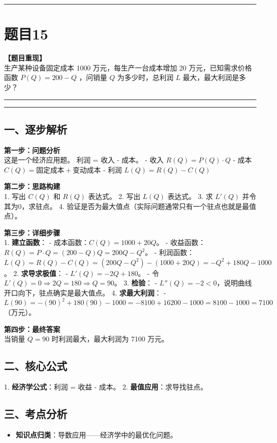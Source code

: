 \documentclass[12pt, a4paper]{ctexart}
\newcommand{\TopSeparator}{
    \par\noindent\rule{\textwidth}{1.5pt}\vspace{0.5em} %
}
\newcommand{\AnalysisSeparator}{
    \par\noindent\rule{\textwidth}{0.5pt}\vspace{0.2em}\hrule\vspace{0.5em} %
}
\newenvironment{RedAnalysis}{
    \par
    \color{red} %
}{
    \par
    \color{black} %
}
\begin{document}
\vspace{2em}

\TopSeparator
\section*{题目15}

\textbf{【题目重现】} \\
生产某种设备固定成本 1000 万元，每生产一台成本增加 20 万元，已知需求价格函数 $ P(Q) = 200 - Q $ ，问销量 $Q$ 为多少时，总利润 $L$ 最大，最大利润是多少？

\AnalysisSeparator

\begin{RedAnalysis}

\subsection*{一、逐步解析}

\textbf{第一步：问题分析} \\
这是一个经济应用题。
利润 = 收入 - 成本。
- 收入 $R(Q) = P(Q) \cdot Q$
- 成本 $C(Q) = \text{固定成本} + \text{变动成本}$
- 利润 $L(Q) = R(Q) - C(Q)$

\textbf{第二步：思路构建} \\
1. 写出 $C(Q)$ 和 $R(Q)$ 表达式。
2. 写出 $L(Q)$ 表达式。
3. 求 $L'(Q)$ 并令其为0，求驻点。
4. 验证是否为最大值点（实际问题通常只有一个驻点也就是最值点）。

\textbf{第三步：详细步骤} \\
1. \textbf{建立函数}：
   - 成本函数：$C(Q) = 1000 + 20Q$。
   - 收益函数：$R(Q) = P \cdot Q = (200 - Q)Q = 200Q - Q^2$。
   - 利润函数：$L(Q) = R(Q) - C(Q) = (200Q - Q^2) - (1000 + 20Q) = -Q^2 + 180Q - 1000$。
2. \textbf{求导求极值}：
   - $L'(Q) = -2Q + 180$。
   - 令 $L'(Q) = 0 \Rightarrow 2Q = 180 \Rightarrow Q = 90$。
3. \textbf{检验}：
   - $L''(Q) = -2 < 0$，说明曲线开口向下，驻点确实是最大值点。
4. \textbf{求最大利润}：
   - $L(90) = -(90)^2 + 180(90) - 1000 = -8100 + 16200 - 1000 = 8100 - 1000 = 7100$（万元）。

\textbf{第四步：最终答案} \\
当销量 $Q=90$ 时利润最大，最大利润为 7100 万元。

\subsection*{二、核心公式}
1. \textbf{经济学公式}：利润 = 收益 - 成本。
2. \textbf{最值应用}：求导找驻点。

\subsection*{三、考点分析}
\begin{itemize}
    \item \textbf{知识点归类}：导数应用——经济学中的最优化问题。
\end{itemize}

\end{RedAnalysis}
\end{document}
